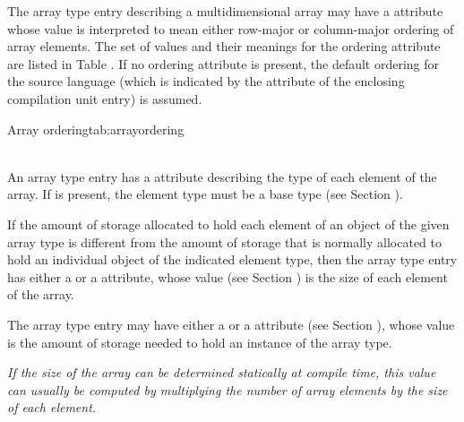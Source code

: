 The\hypertarget{chap:DWATorderingarrayrowcolumnordering}{}
array type entry describing a multidimensional array may
have a \DWATorderingDEFN{} attribute whose
 value is
interpreted to mean either row-major or column-major ordering
of array elements. The set of values and their meanings
for the ordering attribute are listed in
Table .
If no ordering attribute is present, the default ordering
for the source language (which is indicated by the
\bb
\DWATlanguagename{}
\eb
attribute
of the enclosing compilation unit entry) is assumed.

\begin{simplenametable}[1.8in]{Array ordering}{tab:arrayordering}
\DWORDcolmajorTARG{} \\
\DWORDrowmajorTARG{} \\
\end{simplenametable}

An array type entry has
a \DWATtype{} attribute describing
the type of each element of the array.
\bb
If \DWATtensor{} is present, the element type must be a
base type (see Section ).
\eb

If the amount of storage allocated to hold each element of an
object of the given array type is different from the amount
of storage that is normally allocated to hold an individual object
of\hypertarget{chap:DWATbitstridearrayelementstrideofarraytype}{}
the\hypertarget{chap:DWATbytestridearrayelementstrideofarraytype}{}
indicated element type, then the array type entry has either a
\DWATbytestrideDEFN{}
or a
\DWATbitstrideDEFN{}
attribute, whose value
(see Section )
is the size of each
element of the array.

The array type entry may have either a \DWATbytesize{} or a
\DWATbitsize{} attribute
(see Section ),
whose value is the
amount of storage needed to hold an instance of the array type.

\textit{If the size of the array can be determined statically at
compile time, this value can usually be computed by multiplying
the number of array elements by the size of each element.}

